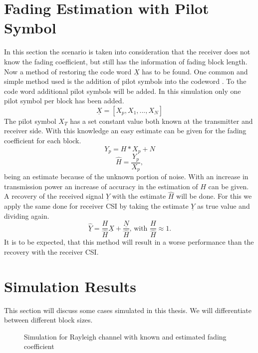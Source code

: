 \section{Fading Estimation with Pilot Symbol}
In this section the scenario is taken into consideration that the receiver does not know the fading coefficient, but still has the information of fading block length. Now a method of restoring the code word \textbf{$\underline{X}$} has to be found.
\newline
One common and simple method used is the addition of pilot symbols into the codeword \cite{Hassibi03}. To the code word additional pilot symbols will be added. In this simulation only one pilot symbol per block has been added. 
\begin{equation}
\underline{X} = [X_p, X_1, ..., X_N]
\end{equation}
The pilot symbol $X_T$ has a set constant value both known at the transmitter and receiver side. With this knowledge an easy estimate can be given for the fading coefficient for each block.
\begin{equation}
Y_p = H * X_p + N
\end{equation}
\begin{equation}
\hat{H} = \frac{Y_p}{X_p},
\end{equation}
being an estimate because of the unknown portion of noise. With an increase in transmission power an increase of accuracy in the estimation of $H$ can be given.
A recovery of the received signal \textbf{$\underline{Y}$} with the estimate {$\hat{H}$} will be done. For this we apply the same done for receiver CSI by taking the estimate \textbf{$\underline{Y}$} as true value and dividing again.
\begin{equation}
\underline{\hat{Y}} = \frac{H}{\hat{H}}\underline{X} + \frac{\underline{N}}{\hat{H}} \textrm{, with } \frac{H}{\hat{H}} \approx 1. 
\end{equation}
It is to be expected, that this method will result in a worse performance than the recovery with the receiver CSI.  

\section{Simulation Results}
This section will discuss some cases simulated in this thesis. We will differentiate between different block sizes.
\begin{figure}[!htb]
	\setlength{}
	\setlength\fheight{0.4\textheight}
	\centering
		
	\caption{Simulation for Rayleigh channel with known and estimated fading coefficient}
	\label{fig:rayferfirst}
\end{figure}

